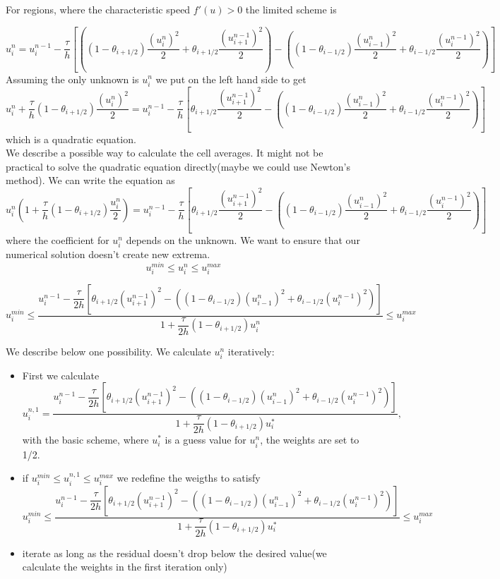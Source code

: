 \documentclass{article}
\begin{document}
For regions, where the characteristic speed $ f'(u) > 0 $ the limited scheme is

\begin{equation}
	u_i^{n} = u_i^{n - 1} - \frac{\tau}{h}\left[
	\left((1 - \theta_{i+1/2})\frac{(u^n_{i})^2}{2} + \theta_{i+1/2}\frac{(u^{n-1}_{i+1})^2}{2} \right)
	- 
	\left((1 - \theta_{i-1/2})\frac{(u^n_{i-1})^2}{2} + \theta_{i-1/2}\frac{(u^{n-1}_{i})^2}{2}\right)
	\right]
\end{equation}
Assuming the only unknown is $ u_i^n $ we put on the left hand side to get
\[
u_i^{n} + \frac{\tau}{h}(1 - \theta_{i+1/2})\frac{(u^n_{i})^2}{2}
=
u_i^{n - 1} - \frac{\tau}{h}\left[
\theta_{i+1/2}\frac{(u^{n-1}_{i+1})^2}{2}
- 
\left((1 - \theta_{i-1/2})\frac{(u^n_{i-1})^2}{2} + \theta_{i-1/2}\frac{(u^{n-1}_{i})^2}{2}\right)
\right]
\]
which is a quadratic equation.\\
We describe a possible way to calculate the cell averages.
It might not be practical to solve the quadratic equation directly(maybe we could use Newton's method). We can write the equation as
\[
u_i^{n}\left(1 + \frac{\tau}{h}(1 - \theta_{i+1/2})\frac{u^n_{i}}{2}\right)
=
u_i^{n - 1} - \frac{\tau}{h}\left[
\theta_{i+1/2}\frac{(u^{n-1}_{i+1})^2}{2}
- 
\left((1 - \theta_{i-1/2})\frac{(u^n_{i-1})^2}{2} + \theta_{i-1/2}\frac{(u^{n-1}_{i})^2}{2}\right)
\right]
\]
where the coefficient for $ u^n_i $ depends on the unknown.
We want to ensure that our numerical solution doesn't create new extrema. 
\[
u_i^{min} \leq u^n_i \leq u_i^{max} 
\]

\begin{equation}
	u_i^{min} \leq 
	\frac{u_i^{n - 1} - \dfrac{\tau}{2h}\left[
		\theta_{i+1/2}(u^{n-1}_{i+1})^2
		- 
		\left((1 - \theta_{i-1/2})(u^n_{i-1})^2 + \theta_{i-1/2}(u^{n-1}_{i})^2\right)
		\right]}{1 + \dfrac{\tau}{2h}(1 - \theta_{i+1/2})u^n_{i}}
	\leq u_i^{max} 
	\label{Burgminmax}
\end{equation}

We describe below one possibility. We calculate $ u^n_i $ iteratively:
\begin{itemize}
	\item First we calculate 
	\[
	u_i^{n,1} =
	\frac{u_i^{n - 1} - \dfrac{\tau}{2h}\left[
		\theta_{i+1/2}(u^{n-1}_{i+1})^2
		- 
		\left((1 - \theta_{i-1/2})(u^n_{i-1})^2 + \theta_{i-1/2}(u^{n-1}_{i})^2\right)
		\right]}{1 + \dfrac{\tau}{2h}(1 - \theta_{i+1/2})u_i^{*}},
	\]
	with the basic scheme, where $ u_i^{*} $ is a guess value for $ u_i^{n}$, the weights are set to 1/2.
	\item if $u_i^{min} \leq  u_i^{n,1} \leq u_i^{max} $ we redefine the weigths to satisfy
	\[
	u_i^{min} \leq 
	\frac{u_i^{n - 1} - \dfrac{\tau}{2h}\left[
		\theta_{i+1/2}(u^{n-1}_{i+1})^2
		- 
		\left((1 - \theta_{i-1/2})(u^n_{i-1})^2 + \theta_{i-1/2}(u^{n-1}_{i})^2\right)
		\right]}{1 + \dfrac{\tau}{2h}(1 - \theta_{i+1/2})u_i^*}
	\leq u_i^{max} 
	\]
	\item iterate as long as the residual doesn't drop below the desired value(we calculate the weights in the first iteration only)
\end{itemize}
\end{document}
